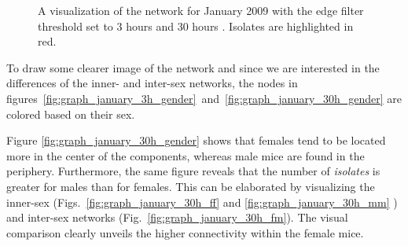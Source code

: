 \begin{figure}[htpb]%
	\centering 
	\qquad 
	\caption[Network visualizations with different edge filter thresholds]{A visualization of the network for January 2009 with the edge filter threshold set to 3 hours  and 30 hours . Isolates are highlighted in red.}  
	 
\end{figure}   

\clearpage

To draw some clearer image of the network and since we are interested in the differences of the inner- and inter-sex networks, the nodes in figures~\ref{fig:graph_january_3h_gender}~and~\ref{fig:graph_january_30h_gender} are colored based on their sex.

Figure \ref{fig:graph_january_30h_gender} shows that females tend to be located more in the center of the components, whereas male mice are found in the periphery. Furthermore, the same figure reveals that the number of \textit{isolates} is greater for males than for females. This can be elaborated by visualizing the inner-sex (Figs.~\ref{fig:graph_january_30h_ff} and \ref{fig:graph_january_30h_mm} ) and inter-sex networks (Fig.~\ref{fig:graph_january_30h_fm}). The visual comparison clearly unveils the higher connectivity within the female mice.

